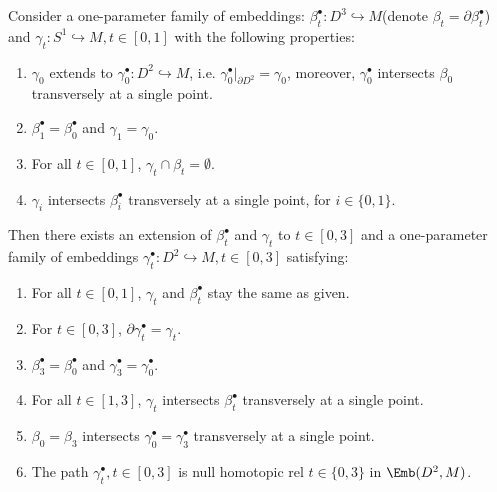 \begin{lemma} \label{lem:one-parameter-replacement}
    Consider a one-parameter family of embeddings: $\beta^\bullet_t: D^3\hookrightarrow M$(denote $\beta_t=\partial\beta_t^\bullet$) and $\gamma_t: S^1\hookrightarrow M, t\in [0,1]$ with the following properties:

    \begin{enumerate}[label=\emph{(\arabic*)}]
        \item $\gamma_0$ extends to $\gamma_0^\bullet: D^2\hookrightarrow M$, i.e. $\gamma_0^\bullet|_{\partial D^2}=\gamma_0$, moreover, $\gamma_0^\bullet$ intersects $\beta_0$ transversely at a single point.
        \item $\beta_1^\bullet =\beta_0^\bullet$ and $\gamma_1=\gamma_0$.
        \item For all $t\in [0,1]$, $\gamma_t \cap \beta_t=\emptyset$.
        \item $\gamma_i$ intersects $\beta_i^\bullet$ transversely at a single point, for $i\in\{0,1\}$.
    \end{enumerate}

    Then there exists an extension of $\beta_t^\bullet$ and $\gamma_t$ to $t\in [0,3]$ and a one-parameter family of embeddings $\gamma_t^\bullet: D^2\hookrightarrow M, t\in [0,3]$ satisfying:

    \begin{enumerate}[label=\emph{(\arabic*)}]
        \item For all $t\in [0,1]$, $\gamma_t$ and $\beta_t^\bullet$ stay the same as given.
        \item For $t\in[0,3]$, $\partial\gamma_t^\bullet=\gamma_t$.
        \item $\beta_3^\bullet=\beta_0^\bullet$ and $\gamma_3^\bullet=\gamma_0^\bullet$.
        \item For all $t\in [1,3]$, $\gamma_t$ intersects $\beta_t^\bullet$ transversely at a single point.
        \item $\beta_0=\beta_3$ intersects $\gamma_0^\bullet =\gamma_3^\bullet$ transversely at a single point.
        \item The path $\gamma_t^\bullet, t\in [0,3]$ is null homotopic rel $t\in \{0,3\}$ in $\Emb(D^2, M)$.
    \end{enumerate}
\end{lemma}

